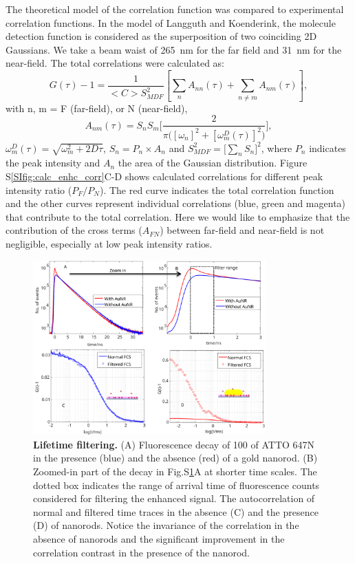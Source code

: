 The theoretical model of the correlation function was compared to experimental correlation functions.
In the model of Langguth and Koenderink\cite{langguth2016exact}, the molecule detection function is considered as the superposition of two coinciding 2D Gaussians.
We take a beam waist of \SI{265}{\nm} for the far field and \SI{31}{\nm} for the near-field.
The total correlations were calculated as:
\begin{equation}
  G(\tau)-1 = \frac{1}{<C>S_{MDF}^2}[\sum_{n}A_{nn}(\tau) + \sum_{n\neq m}A_{nm}(\tau)],
  \label{eq:far-near-gauss}
\end{equation}
with n, m = F (far-field), or N (near-field),
\begin{equation}
  A_{nm}(\tau)=S_nS_m\Bigg[\frac{2}{\pi\Big([\omega_n]^2 + [\omega_m^D(\tau)]^2 \Big)}\Bigg] ,
  \label{eq:area-gauss}
\end{equation}
$\omega_m^D(\tau)=\sqrt{\omega_m^2 + 2D\tau}$, $S_n=P_n\times A_n$ and $S_{MDF}^2=\Big[\sum_{n}S_n\Big]^2$,
where $P_n$ indicates the peak intensity and $A_n$ the area of the Gaussian distribution. 
Figure S\ref{SIfig:calc_enhc_corr}C-D shows calculated correlations for different peak intensity ratio ($P_F/P_N$). 
The red curve indicates the total correlation function and the other curves represent individual correlations (blue, green and magenta) that contribute to the total correlation.
Here we would like to emphasize that the contribution of the cross terms ($A_{FN}$) between far-field and near-field is not negligible, especially at low peak intensity ratios.

\newpage
\begin{figure}[ht]
  \centering
  \includegraphics[width=0.8\textwidth]{lifetime_filtering}
  \makeatletter
  \renewcommand{\fnum@figure}{\figurename~S\thefigure}
  \makeatother{}
  \caption{\textbf{Lifetime filtering.} (A) Fluorescence decay of \SI{100}{\nM} of ATTO 647N in the presence (blue) and the absence (red) of a gold nanorod.
  (B) Zoomed-in part of the decay in Fig.S\ref{SIfig:lifetime-filtering}A at shorter time scales. 
  The dotted box indicates the range of arrival time of fluorescence counts considered for filtering the enhanced signal.
  The autocorrelation of normal and filtered time traces in the absence (C) and the presence (D) of nanorods. 
  Notice the invariance of the correlation in the absence of nanorods and the significant improvement in the correlation contrast in the presence of the nanorod.}
  \label{SIfig:lifetime-filtering}
\end{figure}

